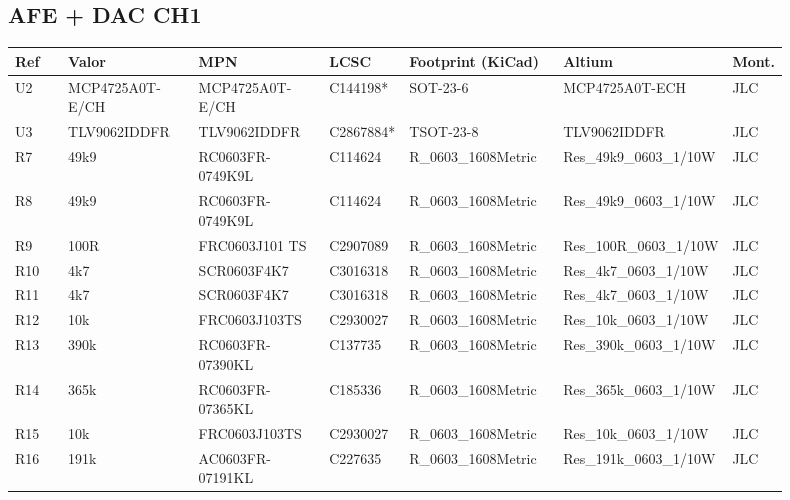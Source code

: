 \documentclass[10pt,a4paper]{article}
\begin{document}
\subsection*{AFE + DAC CH1}
{\scriptsize\begin{longtable}{@{}L{0.07\linewidth}L{0.17\linewidth}L{0.17\linewidth}L{0.09\linewidth}L{0.20\linewidth}L{0.14\linewidth}L{0.06\linewidth}@{}}\toprule
\textbf{Ref} & \textbf{Valor} & \textbf{MPN} & \textbf{LCSC} & \textbf{Footprint (KiCad)} & \textbf{Altium} & \textbf{Mont.}\\\midrule\endhead
U2 & MCP4725A0T-E/CH & MCP4725A0T-E/CH & C144198* & SOT-23-6 & MCP4725A0T-ECH & JLC\\
U3 & TLV9062IDDFR & TLV9062IDDFR & C2867884* & TSOT-23-8 & TLV9062IDDFR & JLC\\
R7 & 49k9 & RC0603FR-0749K9L & C114624 & R\_\allowbreak{}0603\_\allowbreak{}1608Metric & Res\_\allowbreak{}49k9\_\allowbreak{}0603\_\allowbreak{}1/10W & JLC\\
R8 & 49k9 & RC0603FR-0749K9L & C114624 & R\_\allowbreak{}0603\_\allowbreak{}1608Metric & Res\_\allowbreak{}49k9\_\allowbreak{}0603\_\allowbreak{}1/10W & JLC\\
R9 & 100R & FRC0603J101 TS & C2907089 & R\_\allowbreak{}0603\_\allowbreak{}1608Metric & Res\_\allowbreak{}100R\_\allowbreak{}0603\_\allowbreak{}1/10W & JLC\\
R10 & 4k7 & SCR0603F4K7 & C3016318 & R\_\allowbreak{}0603\_\allowbreak{}1608Metric & Res\_\allowbreak{}4k7\_\allowbreak{}0603\_\allowbreak{}1/10W & JLC\\
R11 & 4k7 & SCR0603F4K7 & C3016318 & R\_\allowbreak{}0603\_\allowbreak{}1608Metric & Res\_\allowbreak{}4k7\_\allowbreak{}0603\_\allowbreak{}1/10W & JLC\\
R12 & 10k & FRC0603J103TS & C2930027 & R\_\allowbreak{}0603\_\allowbreak{}1608Metric & Res\_\allowbreak{}10k\_\allowbreak{}0603\_\allowbreak{}1/10W & JLC\\
R13 & 390k & RC0603FR-07390KL & C137735 & R\_\allowbreak{}0603\_\allowbreak{}1608Metric & Res\_\allowbreak{}390k\_\allowbreak{}0603\_\allowbreak{}1/10W & JLC\\
R14 & 365k & RC0603FR-07365KL & C185336 & R\_\allowbreak{}0603\_\allowbreak{}1608Metric & Res\_\allowbreak{}365k\_\allowbreak{}0603\_\allowbreak{}1/10W & JLC\\
R15 & 10k & FRC0603J103TS & C2930027 & R\_\allowbreak{}0603\_\allowbreak{}1608Metric & Res\_\allowbreak{}10k\_\allowbreak{}0603\_\allowbreak{}1/10W & JLC\\
R16 & 191k & AC0603FR-07191KL & C227635 & R\_\allowbreak{}0603\_\allowbreak{}1608Metric & Res\_\allowbreak{}191k\_\allowbreak{}0603\_\allowbreak{}1/10W & JLC\\

\end{longtable}}
\end{document}

